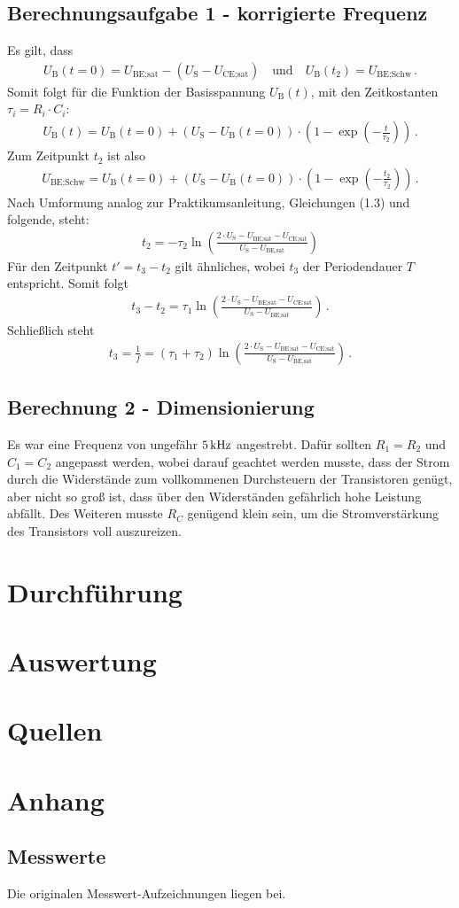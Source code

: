 \documentclass[numbers=noenddot,10pt,a4paper]{scrartcl}
\newcommand{\indx}[1]{_\text{#1}}
\begin{document}
\subsection{Berechnungsaufgabe 1 - korrigierte Frequenz}
Es gilt, dass
\begin{align}
U\indx{B}(t=0)=U\indx{BE;sat}-(U\indx{S}-U\indx{CE;sat}) \quad \text{und} \quad U\indx{B}(t\indx{2})=U\indx{BE;Schw} \, .
\end{align}
Somit folgt für die Funktion der Basisspannung $U\indx{B}(t)$, mit den Zeitkostanten $\tau_i=R_i\cdot C_i$:
\begin{align}
U\indx{B}(t)=U\indx{B}(t=0)+(U\indx{S}-U\indx{B}(t=0))\cdot\left(1-\exp\left(-\frac{t}{\tau\indx{2}}\right)\right) \, .
\end{align}
Zum Zeitpunkt $t\indx{2}$ ist also
\begin{align}
U\indx{BE;Schw}=U\indx{B}(t=0)+(U\indx{S}-U\indx{B}(t=0))\cdot\left(1-\exp\left(-\frac{t\indx{2}}{\tau\indx{2}}\right)\right) \, .
\end{align}
Nach Umformung analog zur Praktikumsanleitung, Gleichungen (1.3) und folgende, steht:
\begin{align}
t\indx{2}=-\tau\indx{2}\ln\left(\frac{2\cdot U\indx{S}-U\indx{BE;sat}-U\indx{CE;sat}}{U\indx{S}-U\indx{BE,sat}}\right)
\end{align}
Für den Zeitpunkt $t'=t\indx{3}-t\indx{2}$ gilt ähnliches, wobei $t\indx{3}$ der Periodendauer $T$ entspricht. Somit folgt
\begin{align}
t_3-t_2=\tau_1 \ln\left(\frac{2\cdot U\indx{S}-U\indx{BE;sat}-U\indx{CE;sat}}{U\indx{S}-U\indx{BE,sat}}\right) \, .
\end{align}
Schließlich steht
\begin{align}
t_3=\frac{1}{f}=(\tau_1+\tau_2)\ln\left(\frac{2\cdot U\indx{S}-U\indx{BE;sat}-U\indx{CE;sat}}{U\indx{S}-U\indx{BE,sat}}\right) \, .
\end{align}
\subsection{Berechnung 2 - Dimensionierung}
Es war eine Frequenz von ungefähr $\unit[5]{kHz}$ angestrebt. Dafür sollten $R_1=R_2$ und $C_1=C_2$ angepasst werden, wobei darauf geachtet werden musste, dass der Strom durch die Widerstände zum vollkommenen Durchsteuern der Transistoren genügt, aber nicht so groß ist, dass über den Widerständen gefährlich hohe Leistung abfällt. Des Weiteren musste $R_C$ genügend klein sein, um die Stromverstärkung des Transistors voll auszureizen.
\section{Durchführung}
\section{Auswertung}
\section{Quellen}
\section{Anhang}
\subsection{Messwerte}
Die originalen Messwert-Aufzeichnungen liegen bei.
\end{document}
